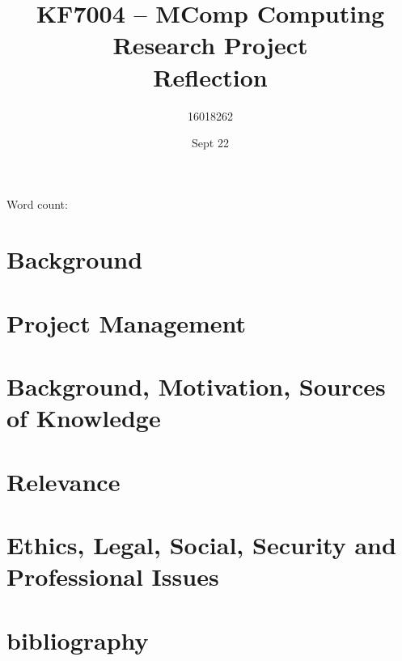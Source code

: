 \documentclass[10pt]{article}
\title{KF7004 – MComp Computing Research Project \\ Reflection}
\author{16018262}
\date{Sept 22}
\begin{document}
\maketitle
\begin{center}
	Word count: 
\end{center}
\tableofcontents
\section{Background}

\section{Project Management}

\section{Background, Motivation, Sources of Knowledge}

\section{Relevance}

\section{Ethics, Legal, Social, Security and Professional Issues}

\section{bibliography}
\printbibliography
\appendix
\end{document}
